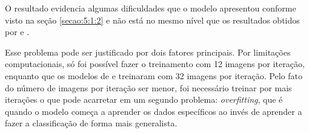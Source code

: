 O resultado evidencia algumas dificuldades que o modelo apresentou conforme visto na seção \ref{secao:5:1:2} e não está no mesmo nível que os resultados obtidos por  e .

Esse problema pode ser justificado por dois fatores principais. Por limitações computacionais, só foi possível fazer o treinamento com 12 imagens por iteração, enquanto que os modelos de  e  treinaram com 32 imagens por iteração. Pelo fato do número de imagens por iteração ser menor, foi necessário treinar por mais iterações o que pode acarretar em um segundo problema: \textit{overfitting}, que é quando o modelo começa a aprender os dados específicos ao invés de aprender a fazer a classificação de forma mais generalista.